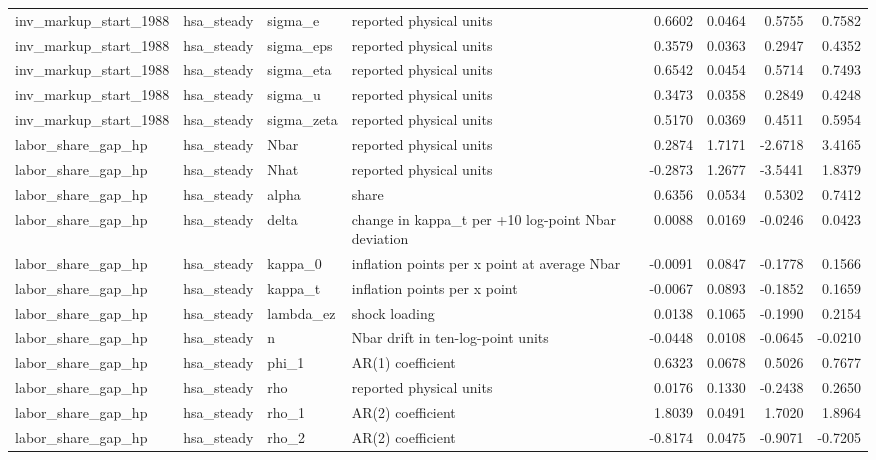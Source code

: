 \begin{tabular}{llllrrrr}
inv\_markup\_start\_1988 & hsa\_steady & sigma\_e & reported physical units & 0.6602 & 0.0464 & 0.5755 & 0.7582 \\
inv\_markup\_start\_1988 & hsa\_steady & sigma\_eps & reported physical units & 0.3579 & 0.0363 & 0.2947 & 0.4352 \\
inv\_markup\_start\_1988 & hsa\_steady & sigma\_eta & reported physical units & 0.6542 & 0.0454 & 0.5714 & 0.7493 \\
inv\_markup\_start\_1988 & hsa\_steady & sigma\_u & reported physical units & 0.3473 & 0.0358 & 0.2849 & 0.4248 \\
inv\_markup\_start\_1988 & hsa\_steady & sigma\_zeta & reported physical units & 0.5170 & 0.0369 & 0.4511 & 0.5954 \\
labor\_share\_gap\_hp & hsa\_steady & Nbar & reported physical units & 0.2874 & 1.7171 & -2.6718 & 3.4165 \\
labor\_share\_gap\_hp & hsa\_steady & Nhat & reported physical units & -0.2873 & 1.2677 & -3.5441 & 1.8379 \\
labor\_share\_gap\_hp & hsa\_steady & alpha & share & 0.6356 & 0.0534 & 0.5302 & 0.7412 \\
labor\_share\_gap\_hp & hsa\_steady & delta & change in kappa\_t per +10 log-point Nbar deviation & 0.0088 & 0.0169 & -0.0246 & 0.0423 \\
labor\_share\_gap\_hp & hsa\_steady & kappa\_0 & inflation points per x point at average Nbar & -0.0091 & 0.0847 & -0.1778 & 0.1566 \\
labor\_share\_gap\_hp & hsa\_steady & kappa\_t & inflation points per x point & -0.0067 & 0.0893 & -0.1852 & 0.1659 \\
labor\_share\_gap\_hp & hsa\_steady & lambda\_ez & shock loading & 0.0138 & 0.1065 & -0.1990 & 0.2154 \\
labor\_share\_gap\_hp & hsa\_steady & n & Nbar drift in ten-log-point units & -0.0448 & 0.0108 & -0.0645 & -0.0210 \\
labor\_share\_gap\_hp & hsa\_steady & phi\_1 & AR(1) coefficient & 0.6323 & 0.0678 & 0.5026 & 0.7677 \\
labor\_share\_gap\_hp & hsa\_steady & rho & reported physical units & 0.0176 & 0.1330 & -0.2438 & 0.2650 \\
labor\_share\_gap\_hp & hsa\_steady & rho\_1 & AR(2) coefficient & 1.8039 & 0.0491 & 1.7020 & 1.8964 \\
labor\_share\_gap\_hp & hsa\_steady & rho\_2 & AR(2) coefficient & -0.8174 & 0.0475 & -0.9071 & -0.7205 \\

\end{tabular}
